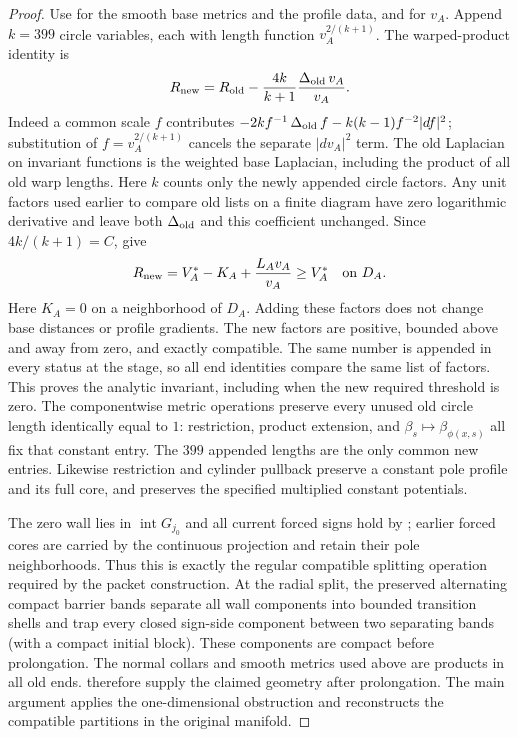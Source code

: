 \documentclass[11pt]{article}
\numberwithin{equation}{section}
\theoremstyle{definition}
\theoremstyle{remark}
\begin{document}
\begin{proof}
Use  for the
smooth base metrics and the profile data, and
 for $v_A$.  Append
$k=399$ circle variables, each with length function
$v_A^{2/(k+1)}$.  The warped-product identity is
\[
 R_{\rm new}=R_{\rm old}-\frac{4k}{k+1}
                    \frac{\operatorname{\Delta}_{\rm old}v_A}{v_A}.
\]
Indeed a common scale $f$ contributes
$-2k f^{-1}\operatorname{\Delta}_{\rm old}f-k(k-1)f^{-2}|df|^2$; substitution of
$f=v_A^{2/(k+1)}$ cancels the separate $|dv_A|^2$ term.
The old Laplacian on invariant functions is the weighted base
Laplacian, including the product of all old warp lengths.  Here $k$ counts only the newly appended circle factors. Any unit
factors used earlier to compare old lists on a finite diagram have
zero logarithmic derivative and leave both $\operatorname{\Delta}_{\rm old}$ and this
coefficient unchanged. Since $4k/(k+1)=C$,  give
\[
 R_{\rm new}=V_A^*-K_A+\frac{L_Av_A}{v_A}
 \ge V_A^*\quad\hbox{on }D_A.
\]
Here $K_A=0$ on a neighborhood of $D_A$.  Adding these factors does
not change base distances or profile gradients.  The new factors
are positive, bounded above and away from zero, and exactly compatible.
The same number is appended in every status at the stage, so all
end identities compare the same list of factors.  This proves the
analytic invariant, including when the new required threshold is zero.
The componentwise metric operations preserve every unused old circle
length identically equal to $1$: restriction, product extension, and
$\beta_s\mapsto\beta_{\phi(x,s)}$ all fix that constant entry.  The
$399$ appended lengths are the only common new entries.  Likewise
restriction and cylinder pullback preserve a constant pole profile and
its full core, and  preserves the
specified multiplied constant potentials.

The zero wall lies in $\operatorname{int}G_{j_0}$ and all current
forced signs hold by ; earlier forced cores
are carried by the continuous projection and retain their pole
neighborhoods.  Thus this is exactly the regular compatible splitting
operation required by the packet construction.  At the radial split,
the preserved alternating compact barrier bands separate all wall
components into bounded transition shells and trap every closed
sign-side component between two separating bands (with a compact
initial block).  These components are compact before prolongation.
The normal collars and smooth metrics used above are products in all
old ends.   therefore supply the
claimed geometry after prolongation.  The main argument applies the
one-dimensional obstruction and reconstructs the compatible partitions in the original manifold.
\end{proof}

 
{}
\begingroup


\endgroup
\end{document}

